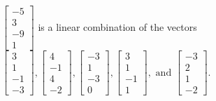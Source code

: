 \begin{exerciseAnswer}
\begin{enumerate}[(a)]
\( \left[\begin{array}{c}
-5 \\
3 \\
-9 \\
1
\end{array}\right] \) is a linear combination of the vectors \( \left[\begin{array}{c}
3 \\
1 \\
-1 \\
-3
\end{array}\right] , \left[\begin{array}{c}
4 \\
-1 \\
4 \\
-2
\end{array}\right] , \left[\begin{array}{c}
-3 \\
1 \\
-3 \\
0
\end{array}\right] , \left[\begin{array}{c}
3 \\
1 \\
-1 \\
1
\end{array}\right] , \text{ and } \left[\begin{array}{c}
-3 \\
2 \\
1 \\
-2
\end{array}\right] \). 


\end{enumerate}
    
\end{exerciseAnswer}
    
